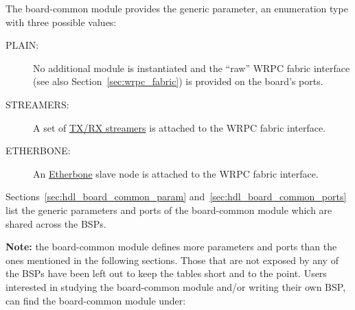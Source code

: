 The board-common module provides the  generic parameter, an enumeration
type with three possible values:

\begin{description}
\item[PLAIN:] No additional module is instantiated and the ``raw'' WRPC fabric interface (see also
  Section~\ref{sec:wrpc_fabric}) is provided on the board's ports.
\item[STREAMERS:] A set of \href{http://www.ohwr.org/projects/wr-cores/wiki/WR_Streamers}{TX/RX
  streamers} is attached to the WRPC fabric interface.
\item[ETHERBONE:] An \href{http://www.ohwr.org/projects/etherbone-core/wiki}{Etherbone} slave node
  is attached to the WRPC fabric interface.
\end{description}

Sections~\ref{sec:hdl_board_common_param} and~\ref{sec:hdl_board_common_ports} list the generic
parameters and ports of the board-common module which are shared across the BSPs.

\textbf{Note:} the board-common module defines more parameters and ports than the ones mentioned in
the following sections. Those that are not exposed by any of the BSPs have been left out to keep the
tables short and to the point. Users interested in studying the board-common module and/or writing
their own BSP, can find the board-common module under:
\\

\newpage
{}
\label{sec:hdl_board_common_param}

